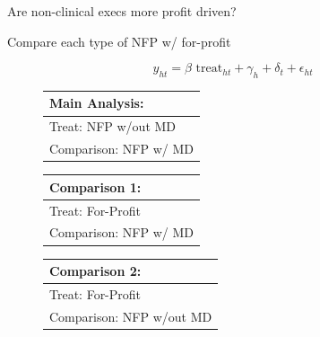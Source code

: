 \documentclass[notes,11pt, aspectratio=169]{beamer}
\begin{document}
\begin{frame}{Are non-clinical execs more profit driven?}
\begin{block}{}
    Compare each type of NFP w/ for-profit
\end{block}
\begin{equation*}
    y_{ht} = \beta \text{ treat}_{ht} + \gamma_{h} + \delta_t + \epsilon_{ht}
\end{equation*}

\begin{figure}[ht!]
    \begin{center}
 \begin{tabular}{| m{18em} |}
 \hline
 Main Analysis:\\ [0.5ex]
 \hline\hline 
 \vspace{2mm}
 Treat: \hspace{20mm} NFP w/out MD \\
 \vspace{2mm} 
 Comparison: \hspace{8mm} NFP w/ MD  \\
 [1ex]
 \hline
 \end{tabular}
\hfil   %
 
\medskip

\vspace{2mm}


  \begin{tabular}{|m{18em}|}
 \hline
 Comparison 1:\\ [0.5ex]
 \hline\hline
 \vspace{2mm}
 Treat: \hspace{20mm} For-Profit \\
 \vspace{2mm}
 Comparison: \hspace{8mm} NFP w/ MD  \\
 [1ex]
 \hline
 \end{tabular}
\hfil   %
  \begin{tabular}{|m{18em}|}
 \hline
 Comparison 2:\\ [0.5ex]
 \hline\hline
 \vspace{2mm}
 Treat:  \hspace{20mm} For-Profit \\
 \vspace{2mm}
 Comparison:  \hspace{8mm} NFP w/out MD  \\
 [1ex]
 \hline
 \end{tabular}
 \end{center}
 \end{figure}

    
\end{frame}
\end{document}
